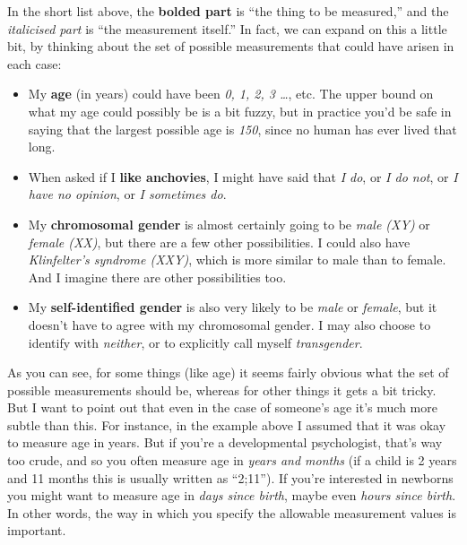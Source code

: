 \documentclass[
]{book}
\providecommand{\tightlist}{%
  \setlength{\itemsep}{0pt}\setlength{\parskip}{0pt}}
\begin{document}
In the short list above, the \textbf{bolded part} is ``the thing to be measured,'' and the \emph{italicised part} is ``the measurement itself.'' In fact, we can expand on this a little bit, by thinking about the set of possible measurements that could have arisen in each case:

\begin{itemize}
\tightlist
\item
  My \textbf{age} (in years) could have been \emph{0, 1, 2, 3 \ldots{}}, etc. The upper bound on what my age could possibly be is a bit fuzzy, but in practice you'd be safe in saying that the largest possible age is \emph{150}, since no human has ever lived that long.
\item
  When asked if I \textbf{like anchovies}, I might have said that \emph{I do}, or \emph{I do not}, or \emph{I have no opinion}, or \emph{I sometimes do}.
\item
  My \textbf{chromosomal gender} is almost certainly going to be \emph{male (XY)} or \emph{female (XX)}, but there are a few other possibilities. I could also have \emph{Klinfelter's syndrome (XXY)}, which is more similar to male than to female. And I imagine there are other possibilities too.
\item
  My \textbf{self-identified gender} is also very likely to be \emph{male} or \emph{female}, but it doesn't have to agree with my chromosomal gender. I may also choose to identify with \emph{neither}, or to explicitly call myself \emph{transgender}.
\end{itemize}

As you can see, for some things (like age) it seems fairly obvious what the set of possible measurements should be, whereas for other things it gets a bit tricky. But I want to point out that even in the case of someone's age it's much more subtle than this. For instance, in the example above I assumed that it was okay to measure age in years. But if you're a developmental psychologist, that's way too crude, and so you often measure age in \emph{years and months} (if a child is 2 years and 11 months this is usually written as ``2;11''). If you're interested in newborns you might want to measure age in \emph{days since birth}, maybe even \emph{hours since birth}. In other words, the way in which you specify the allowable measurement values is important.
\end{document}
